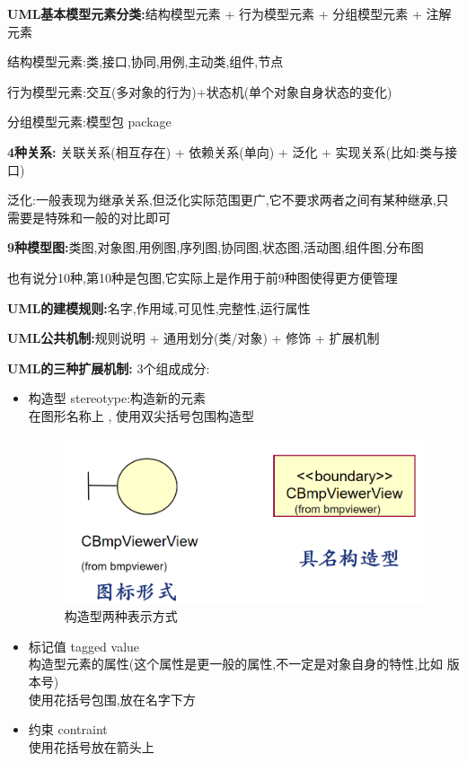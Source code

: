 \documentclass[UTF8,a4paper]{ctexart}
\begin{document}
\textbf{UML基本模型元素分类:}结构模型元素 + 行为模型元素 + 分组模型元素 + 注解元素

结构模型元素:类,接口,协同,用例,主动类,组件,节点

行为模型元素:交互(多对象的行为)+状态机(单个对象自身状态的变化)

分组模型元素:模型包 package

\textbf{4种关系:} 关联关系(相互存在) + 依赖关系(单向) + 泛化 + 实现关系(比如:类与接口)

泛化:一般表现为继承关系,但泛化实际范围更广,它不要求两者之间有某种继承,只需要是特殊和一般的对比即可

\textbf{9种模型图:}类图,对象图,用例图,序列图,协同图,状态图,活动图,组件图,分布图

也有说分10种,第10种是包图,它实际上是作用于前9种图使得更方便管理


\textbf{UML的建模规则:}名字,作用域,可见性,完整性,运行属性

\textbf{UML公共机制:}规则说明 + 通用划分(类/对象) + 修饰 + 扩展机制

\textbf{UML的三种扩展机制:}
3个组成成分:
\begin{itemize}
  \item 构造型 stereotype:构造新的元素\\
  在图形名称上 , 使用双尖括号包围构造型
  \begin{figure}[H]
    \centering
    \includegraphics[scale = 0.3]{assets/SoftwareEngineering_1f53c.png}
    \caption{构造型两种表示方式}
  \end{figure}
  \item 标记值 tagged value\\
  构造型元素的属性(这个属性是更一般的属性,不一定是对象自身的特性,比如 版本号)\\
  使用花括号包围,放在名字下方
  \item 约束 contraint\\
  使用花括号放在箭头上
\end{itemize}
\end{document}
